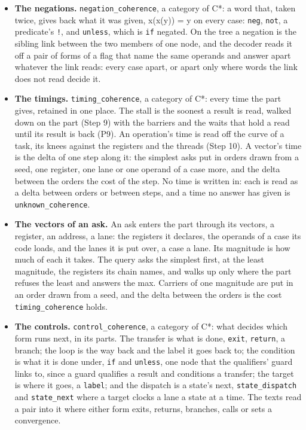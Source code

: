 \begin{itemize}
\item \textbf{The negations.} \texttt{negation\_\allowbreak{}coherence}, a category of C*: a word that, taken twice, gives back what it was given, x(x(y)) = y on every case: \texttt{neg}, \texttt{not}, a predicate's \texttt{!}, and \texttt{unless}, which is \texttt{if} negated. On the tree a negation is the sibling link between the two members of one node, and the decoder reads it off a pair of forms of a flag that name the same operands and answer apart whatever the link reads: every case apart, or apart only where words the link does not read decide it.
\item \textbf{The timings.} \texttt{timing\_\allowbreak{}coherence}, a category of C*: every time the part gives, retained in one place. The stall is the soonest a result is read, walked down on the part (Step 9) with the barriers and the waits that hold a read until its result is back (P9). An operation's time is read off the curve of a task, its knees against the registers and the threads (Step 10). A vector's time is the delta of one step along it: the simplest asks put in orders drawn from a seed, one register, one lane or one operand of a case more, and the delta between the orders the cost of the step. No time is written in: each is read as a delta between orders or between steps, and a time no answer has given is \texttt{unknown\_\allowbreak{}coherence}.
\item \textbf{The vectors of an ask.} An ask enters the part through its vectors, a register, an address, a lane: the registers it declares, the operands of a case its code loads, and the lanes it is put over, a case a lane. Its magnitude is how much of each it takes. The query asks the simplest first, at the least magnitude, the registers its chain names, and walks up only where the part refuses the least and answers the max. Carriers of one magnitude are put in an order drawn from a seed, and the delta between the orders is the cost \texttt{timing\_\allowbreak{}coherence} holds.
\item \textbf{The controls.} \texttt{control\_\allowbreak{}coherence}, a category of C*: what decides which form runs next, in its parts. The transfer is what is done, \texttt{exit}, \texttt{return}, a branch; the loop is the way back and the label it goes back to; the condition is what it is done under, \texttt{if} and \texttt{unless}, one node that the qualifiers' guard links to, since a guard qualifies a result and conditions a transfer; the target is where it goes, a \texttt{label}; and the dispatch is a state's next, \texttt{state\_\allowbreak{}dispatch} and \texttt{state\_\allowbreak{}next} where a target clocks a lane a state at a time. The texts read a pair into it where either form exits, returns, branches, calls or sets a convergence.

\end{itemize}
